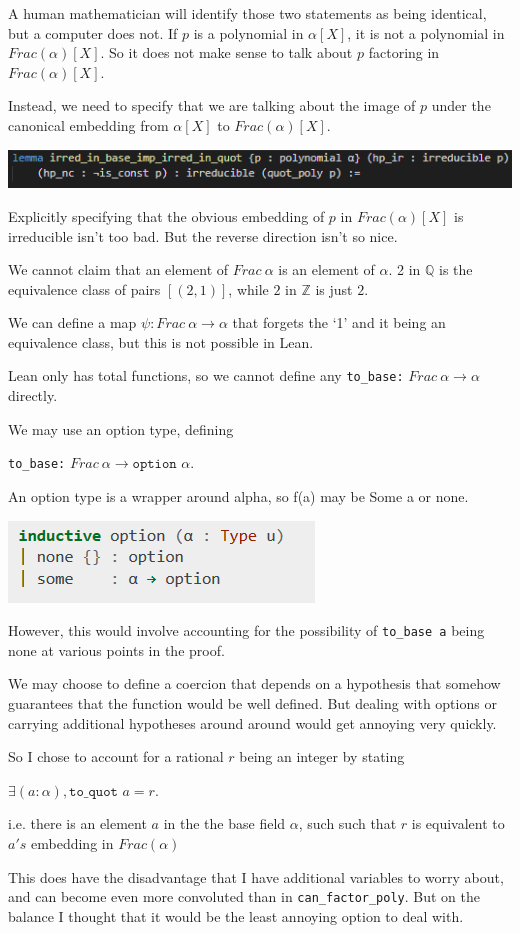\documentclass[pagesize=a4]{scrreprt}
\newcommand{\Z}{\mathbb{Z}}
\newcommand{\Q}{\mathbb{Q}}
\begin{document}
A human mathematician will identify those two statements as being identical, but a computer does not. If $p$ is a polynomial in $\alpha[X]$, it is not a polynomial in $Frac(\alpha)[X]$. So it does not make sense to talk about $p$ factoring in $Frac(\alpha)[X]$. 

Instead, we need to specify that we are talking about the image of $p$ under the canonical embedding from $\alpha[X]$ to $Frac(\alpha)[X]$. 


\includegraphics[width=\textwidth]{gauss_fwd.png}
  
  Explicitly specifying that the obvious embedding of $p$ in $Frac (\alpha) [X]$ is irreducible isn't too bad. But the reverse direction isn't so nice. 
  
  We cannot claim that an element of $Frac\ \alpha$ is an element of $\alpha$. 2 in $\Q$ is the equivalence class of pairs $[(2,1)]$, while $2$ in $\Z$ is just $2$. 
 
We can define a map $\psi : Frac\ \alpha \rightarrow \alpha$ that forgets the `1' and it being an equivalence class, but this is not possible in Lean.

    Lean only has total functions, so we cannot define any \texttt{to\_base:} $Frac\ \alpha \rightarrow \alpha$ directly. 
    
    We may use an option type, defining 

    \texttt{to\_base:} $Frac\ \alpha \rightarrow \texttt{option } \alpha$. 

    An option type is a wrapper around alpha, so f(a) may be Some a or none. 


    \includegraphics[]{option.png}

    However, this would involve accounting for the possibility of \texttt{to\_base a} being none at various points in the proof. 

    We may choose to define a coercion that depends on a hypothesis that somehow guarantees that the function would be well defined.   But dealing with options or carrying additional hypotheses around around would get annoying very quickly.

    So I chose to account for a rational $r$ being an integer by stating 

    $\exists(a : \alpha), \texttt{to\_quot } a = r$. 

    i.e. there is an element $a$ in the the base field $\alpha$, such such that $r$ is equivalent to $a's$ embedding in $Frac(\alpha)$

    This does have the disadvantage that I have additional variables to worry about, and can become even more convoluted than in \texttt{can\_factor\_poly}. But on the balance I thought that it would be the least annoying option to deal with. 
\end{document}
